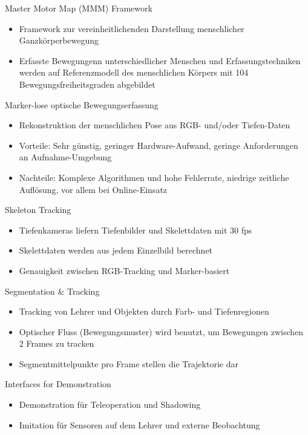 \documentclass[paper=a4, fontsize=11pt]{scrartcl} %
\numberwithin{equation}{section} %
\numberwithin{figure}{section} %
\numberwithin{table}{section} %
\begin{document}
Master Motor Map (MMM) Framework
\begin{itemize}
\item Framework zur vereinheitlichenden Darstellung menschlicher Ganzkörperbewegung
\item Erfasste Bewegungenn unterschiedlicher Menschen und Erfassungstechniken werden auf Referenzmodell des menschlichen Körpers mit 104 Bewegungsfreiheitsgraden abgebildet
\end{itemize}

Marker-lose optische Bewegungserfassung
\begin{itemize}
\item Rekonstruktion der menschlichen Pose aus RGB- und/oder Tiefen-Daten
\item Vorteile: Sehr günstig, geringer Hardware-Aufwand, geringe Anforderungen an Aufnahme-Umgebung
\item Nachteile: Komplexe Algorithmen und hohe Fehlerrate, niedrige zeitliche Auflösung, vor allem bei Online-Einsatz
\end{itemize}

Skeleton Tracking
\begin{itemize}
\item Tiefenkameras liefern Tiefenbilder und Skelettdaten mit 30 fps 
\item Skelettdaten werden aus jedem Einzelbild berechnet 
\item Genauigkeit zwischen RGB-Tracking und Marker-basiert
\end{itemize}

Segmentation \& Tracking
\begin{itemize}
\item Tracking von Lehrer und Objekten durch Farb- und Tiefenregionen
\item Optischer Fluss (Bewegungsmuster) wird benutzt, um Bewegungen zwischen 2 Frames zu tracken
\item Segmentmittelpunkte pro Frame stellen die Trajektorie dar
\end{itemize}

Interfaces for Demonstration
\begin{itemize}
\item Demonstration für Teleoperation und Shadowing
\item Imitation für Sensoren auf dem Lehrer und externe Beobachtung
\end{itemize}
\end{document}
